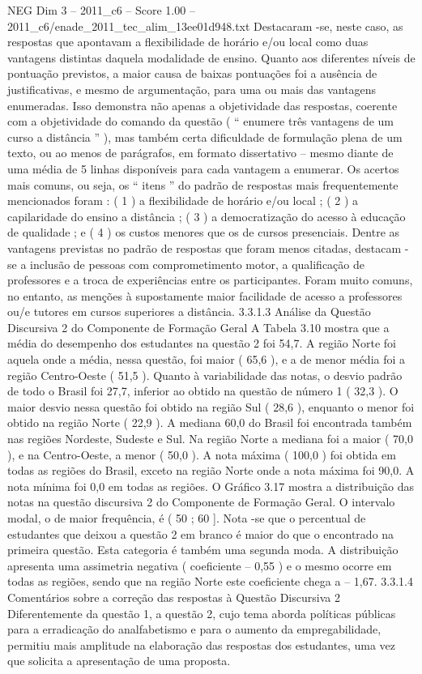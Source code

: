 \begin{textsample}{NEG Dim 3 – 2011\_c6 – Score 1.00 – 2011\_c6/enade\_2011\_tec\_alim\_13ee01d948.txt}
Destacaram -se, neste caso, as respostas que apontavam a flexibilidade de horário e/ou local como duas vantagens distintas daquela modalidade de ensino.
Quanto aos diferentes níveis de pontuação previstos, a maior causa de baixas pontuações foi a ausência de justificativas, e mesmo de argumentação, para uma ou mais das vantagens enumeradas.
Isso demonstra não apenas a objetividade das respostas, coerente com a objetividade do comando da questão ( “ enumere três vantagens de um curso a distância ” ), mas também certa dificuldade de formulação plena de um texto, ou ao menos de parágrafos, em formato dissertativo – mesmo diante de uma média de 5 linhas disponíveis para cada vantagem a enumerar.
Os acertos mais comuns, ou seja, os “ itens ” do padrão de respostas mais frequentemente mencionados foram : ( 1 ) a flexibilidade de horário e/ou local ; ( 2 ) a capilaridade do ensino a distância ; ( 3 ) a democratização do acesso à educação de qualidade ; e ( 4 ) os custos menores que os de cursos presenciais.
Dentre as vantagens previstas no padrão de respostas que foram menos citadas, destacam -se a inclusão de pessoas com comprometimento motor, a qualificação de professores e a troca de experiências entre os participantes.
Foram muito comuns, no entanto, as menções à supostamente maior facilidade de acesso a professores ou/e tutores em cursos superiores a distância. 3.3.1.3 Análise da Questão Discursiva 2 do Componente de Formação Geral A Tabela 3.10 mostra que a média do desempenho dos estudantes na questão 2 foi 54,7.
A região Norte foi aquela onde a média, nessa questão, foi maior ( 65,6 ), e a de menor média foi a região Centro-Oeste ( 51,5 ).
Quanto à variabilidade das notas, o desvio padrão de todo o Brasil foi 27,7, inferior ao obtido na questão de número 1 ( 32,3 ).
O maior desvio nessa questão foi obtido na região Sul ( 28,6 ), enquanto o menor foi obtido na região Norte ( 22,9 ).
A mediana 60,0 do Brasil foi encontrada também nas regiões Nordeste, Sudeste e Sul.
Na região Norte a mediana foi a maior ( 70,0 ), e na Centro-Oeste, a menor ( 50,0 ).
A nota máxima ( 100,0 ) foi obtida em todas as regiões do Brasil, exceto na região Norte onde a nota máxima foi 90,0.
A nota mínima foi 0,0 em todas as regiões.
O Gráfico 3.17 mostra a distribuição das notas na questão discursiva 2 do Componente de Formação Geral.
O intervalo modal, o de maior frequência, é ( 50 ; 60 ].
Nota -se que o percentual de estudantes que deixou a questão 2 em branco é maior do que o encontrado na primeira questão.
Esta categoria é também uma segunda moda.
A distribuição apresenta uma assimetria negativa ( coeficiente – 0,55 ) e o mesmo ocorre em todas as regiões, sendo que na região Norte este coeficiente chega a – 1,67. 3.3.1.4 Comentários sobre a correção das respostas à Questão Discursiva 2 Diferentemente da questão 1, a questão 2, cujo tema aborda políticas públicas para a erradicação do analfabetismo e para o aumento da empregabilidade, permitiu mais amplitude na elaboração das respostas dos estudantes, uma vez que solicita a apresentação de uma proposta.

\end{textsample}
